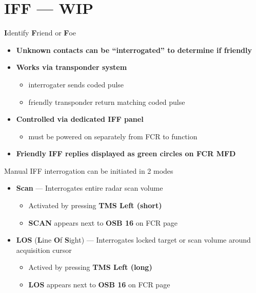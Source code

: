 \section{IFF --- WIP}
\label{sec:iff}

\begin{tcoloritemize}
    \blueitem[IFF]
    \textbf{I}dentify \textbf{F}riend or \textbf{F}oe
    \begin{itemize}
        \item \textbf{Unknown contacts can be ``interrogated'' to determine if friendly}
        \item \textbf{Works via transponder system}
        \begin{itemize}
            \item interrogater sends coded pulse
            \item friendly transponder return matching coded pulse
        \end{itemize}
        \item \textbf{Controlled via dedicated IFF panel}
        \begin{itemize}
            \item must be powered on separately from FCR to function
        \end{itemize}
        \item \textbf{Friendly IFF replies displayed as green circles on FCR MFD}
    \end{itemize}
    Manual IFF interrogation can be initiated in 2 modes

    \begin{itemize}
        \item \textbf{Scan} --- Interrogates entire radar scan volume
        \begin{itemize}
            \item Activated by pressing \textbf{TMS Left (short)}
            \item \textbf{SCAN} appears next to \textbf{OSB 16} on FCR page
        \end{itemize}
        \item \textbf{LOS} (\textbf{L}ine \textbf{O}f \textbf{S}ight) --- Interrogates locked target or scan volume around acquisition cursor
        \begin{itemize}
            \item Actived by pressing \textbf{TMS Left (long)}
            \item \textbf{LOS} appears next to \textbf{OSB 16} on FCR page
        \end{itemize}
    \end{itemize}
\end{tcoloritemize}

